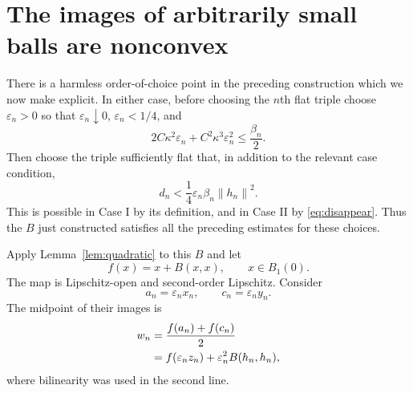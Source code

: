 \documentclass[11pt]{article}
\newcommand{\norm}[1]{\left\lVert #1\right\rVert}
\begin{document}
\section{The images of arbitrarily small balls are nonconvex}

There is a harmless order-of-choice point in the preceding construction
which we now make explicit.  In either case, before choosing the $n$th flat
triple choose $\varepsilon_n>0$ so that $\varepsilon_n\downarrow0$,
$\varepsilon_n<1/4$, and
\begin{equation}\label{eq:epssmall}
 2C\kappa^2\varepsilon_n+C^2\kappa^3\varepsilon_n^2
 \leq\frac{\beta_n}{2}.
\end{equation}
Then choose the triple sufficiently flat that, in addition to the relevant
case condition,
\begin{equation}\label{eq:flatneeded}
 d_n<\frac14\varepsilon_n\beta_n\norm{h_n}^2.
\end{equation}
This is possible in Case I by its definition, and in Case II by
\eqref{eq:disappear}.  Thus the $B$ just constructed satisfies all the
preceding estimates for these choices.

Apply Lemma~\ref{lem:quadratic} to this $B$ and let
\[
                     f(x)=x+B(x,x),\qquad x\in B_1(0).
\]
The map is Lipschitz-open and second-order Lipschitz.  Consider
\[
 a_n=\varepsilon_nx_n,\qquad c_n=\varepsilon_ny_n.
\]
The midpoint of their images is
\begin{align}
 w_n&=\frac{f(a_n)+f(c_n)}2\notag\\
    &=f(\varepsilon_nz_n)
      +\varepsilon_n^2B(h_n,h_n),\label{eq:image-midpoint}
\end{align}
where bilinearity was used in the second line.
\end{document}
